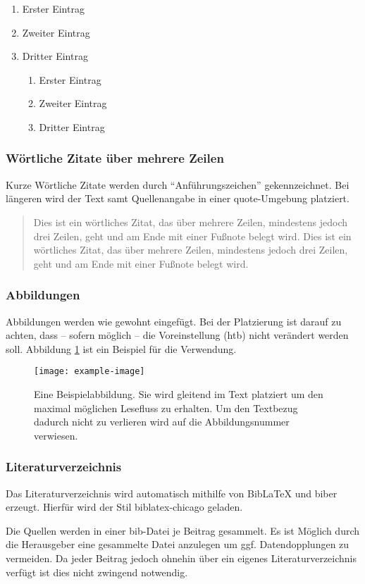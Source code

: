 \begin{enumerate}
	\item Erster Eintrag
	\item Zweiter Eintrag
	\item Dritter Eintrag
	\begin{enumerate}
		\item Erster Eintrag
		\item Zweiter Eintrag
		\item Dritter Eintrag
	\end{enumerate}
\end{enumerate}

\blindtext
\subsubsection{Wörtliche Zitate über mehrere Zeilen}

Kurze Wörtliche Zitate werden durch \enquote{Anführungszeichen} gekennzeichnet. Bei längeren wird der Text samt Quellenangabe in einer quote-Umgebung platziert.

\begin{quote}
	Dies ist ein wörtliches Zitat, das über mehrere Zeilen, mindestens jedoch drei
	Zeilen, geht und am Ende mit einer Fußnote belegt wird. Dies ist ein wörtliches
	Zitat, das über mehrere Zeilen, mindestens jedoch drei Zeilen, geht und am Ende
	mit einer Fußnote belegt wird.\autocite{test.2020}
\end{quote}

\subsubsection{Abbildungen}
Abbildungen werden wie gewohnt eingefügt. Bei der Platzierung ist darauf zu achten, dass – sofern möglich – die Voreinstellung (htb) nicht verändert werden soll.
Abbildung \ref{fig:example-image} ist ein Beispiel für die Verwendung. 

\begin{figure}
	\centering
	\texttt{[image: example-image]}
	\caption{Eine Beispielabbildung. Sie wird gleitend im Text platziert um den maximal möglichen Lesefluss zu erhalten. Um den Textbezug dadurch nicht zu verlieren wird auf die Abbildungsnummer verwiesen.}
	\label{fig:example-image}
\end{figure}


\subsubsection{Literaturverzeichnis}

Das Literaturverzeichnis wird automatisch mithilfe von BibLaTeX und biber erzeugt. Hierfür wird der Stil biblatex-chicago geladen. 

Die Quellen werden in einer bib-Datei je Beitrag gesammelt. Es ist Möglich durch die Herausgeber eine gesammelte Datei anzulegen um ggf. Datendopplungen zu vermeiden. Da jeder Beitrag jedoch ohnehin über ein eigenes Literaturverzeichnis verfügt ist dies nicht zwingend notwendig. 


\printbibliography